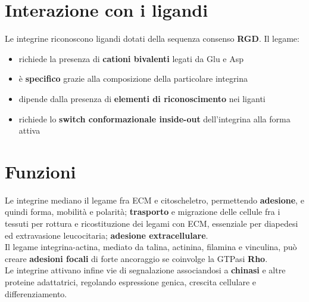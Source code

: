 \documentclass[a4paper, 12pt]{article}
\begin{document}
\section{Interazione con i ligandi}
Le integrine riconoscono ligandi dotati della sequenza consenso \textbf{RGD}. Il legame:
\begin{itemize}
  \item richiede la presenza di \textbf{cationi bivalenti} legati da Glu e Asp
  \item è \textbf{specifico} grazie alla composizione della particolare integrina
  \item dipende dalla presenza di \textbf{elementi di riconoscimento} nei liganti
  \item richiede lo \textbf{switch conformazionale inside-out} dell'integrina alla forma attiva
\end{itemize}

\section{Funzioni}
Le integrine mediano il legame fra ECM e citoscheletro, permettendo \textbf{adesione}, e quindi forma, mobilità e polarità; \textbf{trasporto} e migrazione delle cellule fra i tessuti per rottura e ricostituzione dei legami con ECM, essenziale per diapedesi ed extravasione leucocitaria; \textbf{adesione extracellulare}.\\
Il legame integrina-actina, mediato da talina, actinina, filamina e vinculina, può creare \textbf{adesioni focali} di forte ancoraggio se coinvolge la GTPasi \textbf{Rho}.\\
Le integrine attivano infine vie di segnalazione associandosi a \textbf{chinasi} e altre proteine adattatrici, regolando espressione genica, crescita cellulare e differenziamento.
\end{document}
